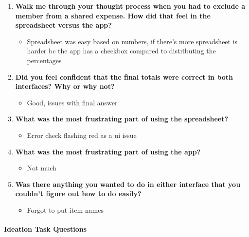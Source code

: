 \documentclass[12pt,a4paper]{article}
\begin{document}
\begin{enumerate}
    \item \textbf{Walk me through your thought process when you had to exclude a member from a shared expense. How did that feel in the spreadsheet versus the app?}
    
    \begin{itemize}
        \item Spreadsheet was easy based on numbers, if there's more spreadsheet is harder bc the app has a checkbox compared to distributing the percentages
    \end{itemize}
    
    \item \textbf{Did you feel confident that the final totals were correct in both interfaces? Why or why not?}
    
    \begin{itemize}
        \item Good, issues with final answer
    \end{itemize}
    
    \item \textbf{What was the most frustrating part of using the spreadsheet?}
    
    \begin{itemize}
        \item Error check flashing red as a ui issue
    \end{itemize}
    
    \item \textbf{What was the most frustrating part of using the app?}
    
    \begin{itemize}
        \item Not much
    \end{itemize}
    
    \item \textbf{Was there anything you wanted to do in either interface that you couldn't figure out how to do easily?}
    
    \begin{itemize}
        \item Forgot to put item names
    \end{itemize}
\end{enumerate}


\paragraph{Ideation Task Questions}
\end{document}
